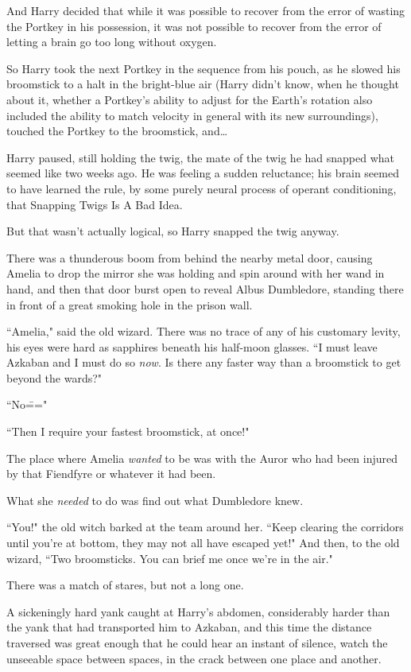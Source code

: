 And Harry decided that while it was possible to recover from the error of wasting the Portkey in his possession, it was not possible to recover from the error of letting a brain go too long without oxygen.

So Harry took the next Portkey in the sequence from his pouch, as he slowed his broomstick to a halt in the bright-blue air (Harry didn't know, when he thought about it, whether a Portkey's ability to adjust for the Earth's rotation also included the ability to match velocity in general with its new surroundings), touched the Portkey to the broomstick, and{\ldots}

Harry paused, still holding the twig, the mate of the twig he had snapped what seemed like two weeks ago. He was feeling a sudden reluctance; his brain seemed to have learned the rule, by some purely neural process of operant conditioning, that Snapping Twigs Is A Bad Idea.

But that wasn't actually logical, so Harry snapped the twig anyway.

\later

There was a thunderous boom from behind the nearby metal door, causing Amelia to drop the mirror she was holding and spin around with her wand in hand, and then that door burst open to reveal Albus Dumbledore, standing there in front of a great smoking hole in the prison wall.

``Amelia," said the old wizard. There was no trace of any of his customary levity, his eyes were hard as sapphires beneath his half-moon glasses. ``I must leave Azkaban and I must do so \emph{now}. Is there any faster way than a broomstick to get beyond the wards?"

``No\==="

``Then I require your fastest broomstick, at once!"

The place where Amelia \emph{wanted} to be was with the Auror who had been injured by that Fiendfyre or whatever it had been.

What she \emph{needed} to do was find out what Dumbledore knew.

``You!" the old witch barked at the team around her. ``Keep clearing the corridors until you're at bottom, they may not all have escaped yet!" And then, to the old wizard, ``Two broomsticks. You can brief me once we're in the air."

There was a match of stares, but not a long one.

\later

A sickeningly hard yank caught at Harry's abdomen, considerably harder than the yank that had transported him to Azkaban, and this time the distance traversed was great enough that he could hear an instant of silence, watch the unseeable space between spaces, in the crack between one place and another.

